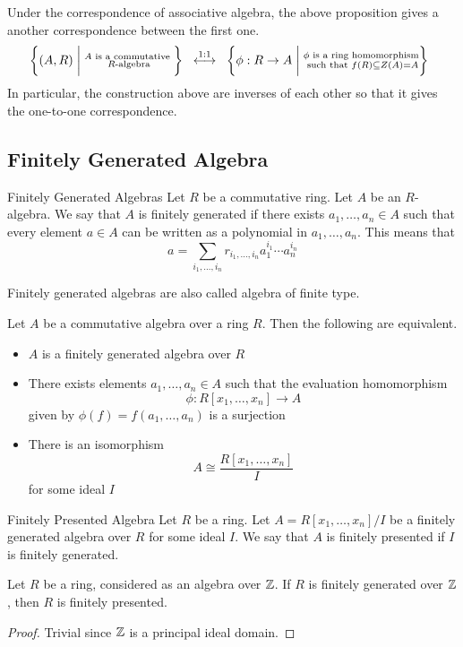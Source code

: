\documentclass[a4paper]{article}
\begin{document}
Under the correspondence of associative algebra, the above proposition gives a another correspondence between the first one. $$\left\{(A,R)\;\bigg{|}\;\substack{A\text{ is a commutative }\\R\text{-algebra}}\right\}\;\;\overset{1:1}{\longleftrightarrow}\;\;\left\{\phi:R\to A\;\bigg{|}\;\substack{\phi\text{ is a ring homomorphism}\\\text{ such that }f(R)\subseteq Z(A)=A}\right\}\;\;$$ In particular, the construction above are inverses of each other so that it gives the one-to-one correspondence. 

\subsection{Finitely Generated Algebra}
\begin{defn}{Finitely Generated Algebras}{} Let $R$ be a commutative ring. Let $A$ be an $R$-algebra. We say that $A$ is finitely generated if there exists $a_1,\dots,a_n\in A$ such that every element $a\in A$ can be written as a polynomial in $a_1,\dots,a_n$. This means that $$a=\sum_{i_1,\dots,i_n}r_{i_1,\dots,i_n}a_1^{i_1}\cdots a_n^{i_n}$$
\end{defn}

Finitely generated algebras are also called algebra of finite type. 

\begin{thm}{}{} Let $A$ be a commutative algebra over a ring $R$. Then the following are equivalent. 
\begin{itemize}
\item $A$ is a finitely generated algebra over $R$
\item There exists elements $a_1,\dots,a_n\in A$ such that the evaluation homomorphism $$\phi:R[x_1,\dots,x_n]\to A$$ given by $\phi(f)=f(a_1,\dots,a_n)$ is a surjection
\item There is an isomorphism $$A\cong\frac{R[x_1,\dots,x_n]}{I}$$ for some ideal $I$
\end{itemize}
\end{thm}

\begin{defn}{Finitely Presented Algebra}{} Let $R$ be a ring. Let $A=R[x_1,\dots,x_n]/I$ be a finitely generated algebra over $R$ for some ideal $I$. We say that $A$ is finitely presented if $I$ is finitely generated. 
\end{defn}

\begin{lmm}{}{} Let $R$ be a ring, considered as an algebra over $\mathbb{Z}$. If $R$ is finitely generated over $\mathbb{Z}$, then $R$ is finitely presented. \tcbline
\begin{proof}
Trivial since $\mathbb{Z}$ is a principal ideal domain. 
\end{proof}
\end{lmm}
\end{document}
